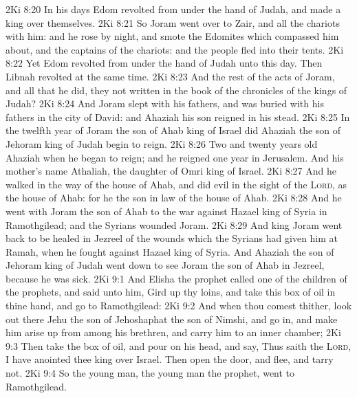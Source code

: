 \vs 2Ki 8:20 In his days Edom revolted from under the hand of Judah, and made a king over themselves.
\vs 2Ki 8:21 So Joram went over to Zair, and all the chariots with him: and he rose by night, and smote the Edomites which compassed him about, and the captains of the chariots: and the people fled into their tents.
\vs 2Ki 8:22 Yet Edom revolted from under the hand of Judah unto this day. Then Libnah revolted at the same time.
\vs 2Ki 8:23 And the rest of the acts of Joram, and all that he did,  they not written in the book of the chronicles of the kings of Judah?
\vs 2Ki 8:24 And Joram slept with his fathers, and was buried with his fathers in the city of David: and Ahaziah his son reigned in his stead.
\vs 2Ki 8:25 In the twelfth year of Joram the son of Ahab king of Israel did Ahaziah the son of Jehoram king of Judah begin to reign.
\vs 2Ki 8:26 Two and twenty years old  Ahaziah when he began to reign; and he reigned one year in Jerusalem. And his mother's name  Athaliah, the daughter of Omri king of Israel.
\vs 2Ki 8:27 And he walked in the way of the house of Ahab, and did evil in the sight of the \textsc{Lord}, as  the house of Ahab: for he  the son in law of the house of Ahab.
\vs 2Ki 8:28 And he went with Joram the son of Ahab to the war against Hazael king of Syria in Ramothgilead; and the Syrians wounded Joram.
\vs 2Ki 8:29 And king Joram went back to be healed in Jezreel of the wounds which the Syrians had given him at Ramah, when he fought against Hazael king of Syria. And Ahaziah the son of Jehoram king of Judah went down to see Joram the son of Ahab in Jezreel, because he was sick.
\vs 2Ki 9:1 And Elisha the prophet called one of the children of the prophets, and said unto him, Gird up thy loins, and take this box of oil in thine hand, and go to Ramothgilead:
\vs 2Ki 9:2 And when thou comest thither, look out there Jehu the son of Jehoshaphat the son of Nimshi, and go in, and make him arise up from among his brethren, and carry him to an inner chamber;
\vs 2Ki 9:3 Then take the box of oil, and pour  on his head, and say, Thus saith the \textsc{Lord}, I have anointed thee king over Israel. Then open the door, and flee, and tarry not.
\vs 2Ki 9:4 So the young man,  the young man the prophet, went to Ramothgilead.

